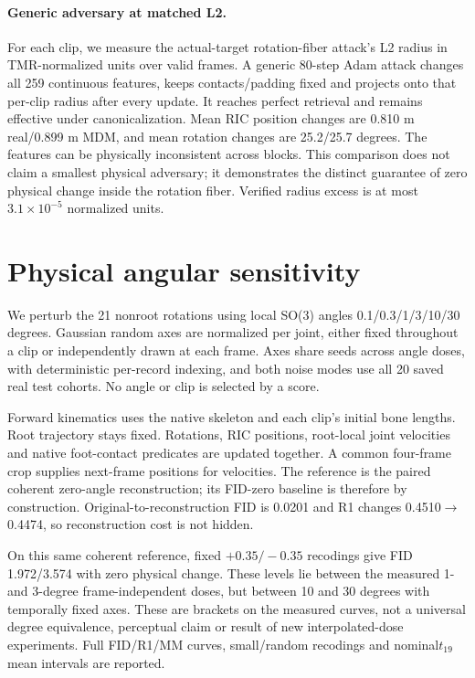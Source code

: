 \documentclass[10pt,twocolumn,letterpaper]{article}
\begin{document}
\paragraph{Generic adversary at matched L2.}
For each clip, we measure the actual-target rotation-fiber attack's L2 radius in TMR-normalized units over valid frames. A generic 80-step Adam attack changes all 259 continuous features, keeps contacts/padding fixed and projects onto that per-clip radius after every update. It reaches perfect retrieval and remains effective under canonicalization. Mean RIC position changes are 0.810 m real/0.899 m MDM, and mean rotation changes are 25.2/25.7 degrees. The features can be physically inconsistent across blocks. This comparison does not claim a smallest physical adversary; it demonstrates the distinct guarantee of zero physical change inside the rotation fiber. Verified radius excess is at most $3.1\times 10^{-5}$ normalized units.


\section{Physical angular sensitivity}

We perturb the 21 nonroot rotations using local SO(3) angles 0.1/0.3/1/3/10/30 degrees. Gaussian random axes are normalized per joint, either fixed throughout a clip or independently drawn at each frame. Axes share seeds across angle doses, with deterministic per-record indexing, and both noise modes use all 20 saved real test cohorts. No angle or clip is selected by a score.

Forward kinematics uses the native skeleton and each clip's initial bone lengths. Root trajectory stays fixed. Rotations, RIC positions, root-local joint velocities and native foot-contact predicates are updated together. A common four-frame crop supplies next-frame positions for velocities. The reference is the paired coherent zero-angle reconstruction; its FID-zero baseline is therefore by construction. Original-to-reconstruction FID is 0.0201 and R1 changes 0.4510$\to$0.4474, so reconstruction cost is not hidden.

On this same coherent reference, fixed $+0.35/-0.35$ recodings give FID 1.972/3.574 with zero physical change. These levels lie between the measured 1- and 3-degree frame-independent doses, but between 10 and 30 degrees with temporally fixed axes. These are brackets on the measured curves, not a universal degree equivalence, perceptual claim or result of new interpolated-dose experiments. Full FID/R1/MM curves, small/random recodings and nominal$t_{19}$ mean intervals are reported.
\end{document}
